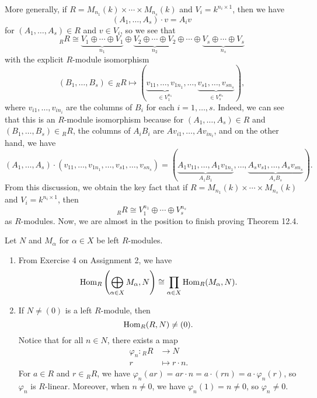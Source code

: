 More generally, if $R = M_{n_1}(k) \times \cdots \times M_{n_s}(k)$ and 
$V_i = k^{n_i \times 1}$, then we have 
\[ (A_1, \dots, A_s) \cdot v = A_i v \] 
for $(A_1, \dots, A_s) \in R$ and $v \in V_i$, so we see that 
\[ {}_R R \cong \underbrace{V_1 \oplus \cdots \oplus V_1}_{n_1} 
\oplus \underbrace{V_2 \oplus \cdots \oplus V_2}_{n_2} \oplus \cdots 
\oplus \underbrace{V_s \oplus \cdots \oplus V_s}_{n_s} \] 
with the explicit $R$-module isomorphism 
\[ (B_1, \dots, B_s) \in {}_R R \mapsto 
(\underbrace{v_{11}, \dots, v_{1n_1}}_{\in V_1^{n_1}}, 
\dots, \underbrace{v_{s1}, \dots, v_{sn_s}}_{\in V_s^{n_s}}), \] 
where $v_{i1}, \dots, v_{in_i}$ are the columns of $B_i$ for each 
$i = 1, \dots, s$. Indeed, we can see that this is an $R$-module isomorphism 
because for $(A_1, \dots, A_s) \in R$ and $(B_1, \dots, B_s) \in {}_R R$, the 
columns of $A_i B_i$ are $Av_{i1}, \dots, Av_{in_i}$, and on the other hand, 
we have 
\[ (A_1, \dots, A_s) \cdot (v_{11}, \dots, v_{1n_1}, \dots, 
v_{s1}, \dots, v_{sn_s}) = 
(\underbrace{A_1 v_{11}, \dots, A_1 v_{1n_1}}_{A_1B_1}, 
\dots, \underbrace{A_s v_{s1}, \dots, A_s v_{sn_s}}_{A_sB_s}). \] 
From this discussion, we obtain the key fact that if $R = M_{n_1}(k) \times \cdots \times 
M_{n_s}(k)$ and $V_i = k^{n_i \times 1}$, then 
\[ {}_R R \cong V_1^{n_1} \oplus \cdots \oplus V_s^{n_s} \] 
as $R$-modules. Now, we are almost in the position to finish proving Theorem 12.4.

\begin{remark} Let $N$ and $M_\alpha$ for $\alpha \in X$ be left $R$-modules. 
    \begin{enumerate}[(1)]
        \item From Exercise 4 on Assignment 2, we have 
        \[ \operatorname{Hom}_R \left( \bigoplus_{\alpha \in X} M_\alpha, N \right) 
        \cong \prod_{\alpha \in X} \operatorname{Hom}_R(M_\alpha, N). \] 
        \item If $N \neq (0)$ is a left $R$-module, then 
        \[ \operatorname{Hom}_R(R, N) \neq (0). \] 
        Notice that for all $n \in N$, there exists a map 
        \begin{align*} \varphi_n : {}_R R &\to N \\ r &\mapsto r \cdot n. \end{align*} 
        For $a \in R$ and $r \in {}_R R$, we have $\varphi_n(ar) = ar \cdot n 
        = a \cdot (rn) = a \cdot \varphi_n(r)$, so $\varphi_n$ is $R$-linear. 
        Moreover, when $n \neq 0$, we have $\varphi_n(1) = n \neq 0$, so 
        $\varphi_n \neq 0$. 
    \end{enumerate}
\end{remark}

